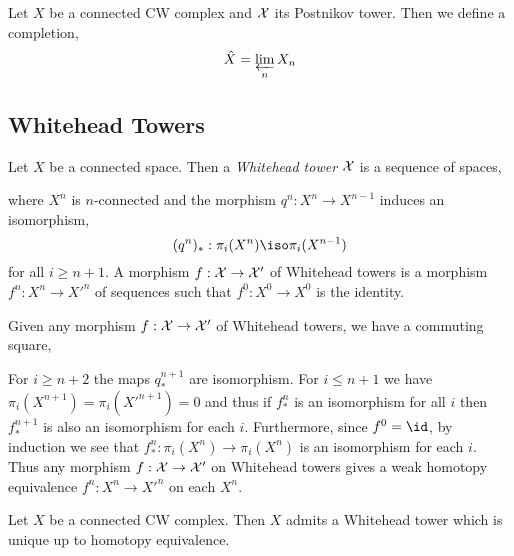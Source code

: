 \documentclass[12pt]{extarticle}
\begin{document}
\begin{defn}
Let $X$ be a connected CW complex and $\mathcal{X}$ its Postnikov tower. Then we define a completion,
\[ \hat{X} = \varprojlim_{n} X_n \]
\end{defn}

\subsection{Whitehead Towers}

\begin{defn}
Let $X$ be a connected space. Then a \textit{Whitehead tower} $\mathcal{X}$ is a sequence of spaces,
\begin{center}
\end{center}
where $X^n$ is $n$-connected and the morphism $q^n : X^n \to X^{n-1}$ induces an isomorphism,
\[ (q^n)_* : \pi_i(X^n) \iso \pi_i(X^{n-1}) \]
for all $i \ge n+1$. A morphism $f : \mathcal{X} \to \mathcal{X}'$ of Whitehead towers is a morphism $f^n : X^n \to X'^n$ of sequences such that $f^0 : X^0 \to X^0$ is the identity.
\end{defn}

\begin{rmk}
Given any morphism $f : \mathcal{X} \to \mathcal{X}'$ of Whitehead towers, we have a commuting square,
\begin{center}
\end{center}
For $i \ge n + 2$ the maps $q^{n+1}_*$ are isomorphism. For $i \le n + 1$ we have $\pi_i(X^{n+1}) = \pi_i(X'^{n+1}) = 0$ and thus if $f_*^n$ is an isomorphism for all $i$ then $f^{n+1}_*$ is also an isomorphism for each $i$. Furthermore, since $f^0 = \id$, by induction we see that $f^n_* : \pi_i(X^n) \to \pi_i(X^n)$ is an isomorphism for each $i$. Thus any morphism $f : \mathcal{X} \to \mathcal{X}'$ on Whitehead towers gives a weak homotopy equivalence $f^n : X^n \to X'^n$ on each $X^n$. 
\end{rmk}

\begin{theorem}
Let $X$ be a connected CW complex. Then $X$ admits a Whitehead tower which is unique up to homotopy equivalence. 
\end{theorem}
\end{document}
